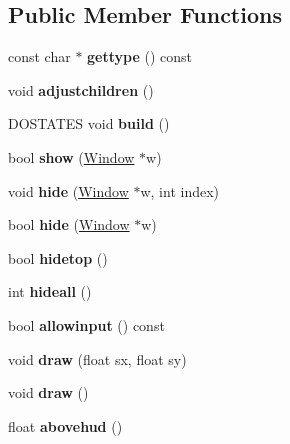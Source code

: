 \subsection*{Public Member Functions}
\begin{DoxyCompactItemize}
\item 
\mbox{\label{struct_u_i_1_1_world_a895c0cbaf920d7e6e66b0c7c047f46a8}} 
const char $\ast$ {\bfseries gettype} () const
\item 
\mbox{\label{struct_u_i_1_1_world_a1788d6abf9566741ece1e63327b664d7}} 
void {\bfseries adjustchildren} ()
\item 
\mbox{\label{struct_u_i_1_1_world_a6e0716b6a7b2d354e6c6545ea97f0568}} 
D\+O\+S\+T\+A\+T\+ES void {\bfseries build} ()
\item 
\mbox{\label{struct_u_i_1_1_world_a25222fa2e8d4dfda34570dacdd42270a}} 
bool {\bfseries show} (\hyperlink{struct_u_i_1_1_window}{Window} $\ast$w)
\item 
\mbox{\label{struct_u_i_1_1_world_ac6987807f6e5441eec4aee7c37dc54d6}} 
void {\bfseries hide} (\hyperlink{struct_u_i_1_1_window}{Window} $\ast$w, int index)
\item 
\mbox{\label{struct_u_i_1_1_world_a341a4073d5f6a95d17c9409f6728a79f}} 
bool {\bfseries hide} (\hyperlink{struct_u_i_1_1_window}{Window} $\ast$w)
\item 
\mbox{\label{struct_u_i_1_1_world_a63b2f79cb35a4ffcf164396462c9dd2f}} 
bool {\bfseries hidetop} ()
\item 
\mbox{\label{struct_u_i_1_1_world_a4bce78e3a4c92b24d987d61a34f6097c}} 
int {\bfseries hideall} ()
\item 
\mbox{\label{struct_u_i_1_1_world_ac852b1dec39178753721f9fd3c215fcb}} 
bool {\bfseries allowinput} () const
\item 
\mbox{\label{struct_u_i_1_1_world_afe3a96ce61b5e8847a26269d4e66e8b7}} 
void {\bfseries draw} (float sx, float sy)
\item 
\mbox{\label{struct_u_i_1_1_world_a322a68bd7409f90f48e5142962364251}} 
void {\bfseries draw} ()
\item 
\mbox{\label{struct_u_i_1_1_world_ab026a7ddee91834cf1dc6848ed1b948b}} 
float {\bfseries abovehud} ()
\end{DoxyCompactItemize}
